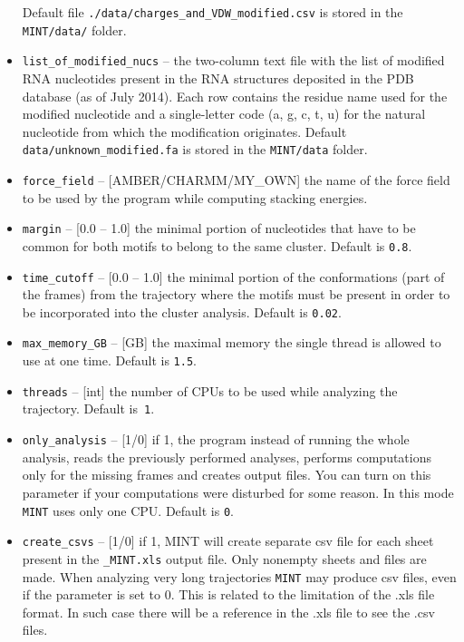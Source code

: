 \documentclass[12pt]{article}
\begin{document}
\begin{itemize}
Default file {\tt ./data/charges\_and\_VDW\_modified.csv} is stored in the {\tt MINT/data/} folder.
\item {\tt list\_of\_modified\_nucs} -- the two-column text file with the list of modified RNA nucleotides present in the RNA structures deposited in the PDB database (as of July 2014). Each row contains the residue name used for the modified nucleotide and a single-letter code (a, g, c, t, u) for the natural nucleotide from which the modification originates. Default {\tt data/unknown\_modified.fa} is stored in the {\tt MINT/data} folder.
\item {\tt force\_field} --  [AMBER/CHARMM/MY\_OWN] the name of the force field to be used by the program while computing stacking energies.
\item {\tt margin} -- [0.0 -- 1.0]  the minimal portion of nucleotides that have to be common for both motifs to belong to the same cluster. Default is {\tt 0.8}.
\item {\tt time\_cutoff} -- [0.0 -- 1.0] the minimal portion of the conformations (part of the frames) from the trajectory where the motifs must be present in order to be incorporated into the cluster analysis. Default is {\tt 0.02}.
\item {\tt max\_memory\_GB} -- [GB] the maximal memory the single thread is allowed to use at one time. Default is {\tt 1.5}.
\item {\tt threads} -- [int] the number of CPUs to be used while analyzing  the trajectory. Default is~{\tt 1}.
\item {\tt only\_analysis} -- [1/0] if 1, the program instead of running the whole analysis, reads the previously performed analyses, performs computations only for the missing frames and creates output files. You can turn on this parameter if your computations were disturbed for some reason. In this mode {\tt MINT} uses only one CPU. Default is {\tt 0}.
\item {\tt create\_csvs}  -- [1/0] if 1, MINT will create separate csv file for each sheet present in the {\tt \_MINT.xls} output file. Only nonempty sheets and files are made. When analyzing very long trajectories {\tt MINT} may produce csv files, even if the parameter is set to 0. This is related to the limitation of the .xls file format. In such case there will be a reference in the .xls file to see the .csv files.

\end{itemize}
\end{document}

